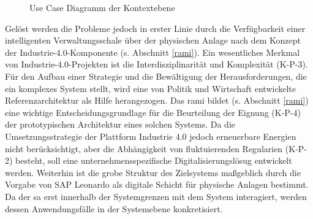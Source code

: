 \begin{figure}[ht!]
  \centering
  \noindent{}
  \caption[Use Case Diagramm der Kontextebene]{Use Case Diagramm der Kontextebene}
  \label{usecase_basic}
\end{figure}
\noindent Gelöst werden die Probleme jedoch in erster Linie durch die Verfügbarkeit einer intelligenten Verwaltungsschale über der physischen Anlage nach dem Konzept der Industrie-4.0-Komponente (s. Abschnitt \ref{rami}).
Ein wesentliches Merkmal von Industrie-4.0-Projekten ist die Interdisziplinarität und Komplexität (K-P-3). Für den Aufbau einer Strategie und die Bewältigung der Herausforderungen, die ein komplexes System stellt, wird eine von Politik und Wirtschaft entwickelte Referenzarchitektur als Hilfe herangezogen. Das \ac{rami} bildet (s. Abschnitt \ref{rami}) eine wichtige Entscheidungsgrundlage für die Beurteilung der Eignung (K-P-4) der prototypischen Architektur eines solchen Systems. Da die Umsetzungsstrategie der Plattform Industrie 4.0 \citep{BITKOM2015} jedoch erneuerbare Energien nicht berücksichtigt, aber die Abhängigkeit von fluktuierenden Regularien (K-P-2) besteht, soll eine unternehmensspezifische Digitalisierungslösug entwickelt werden. Weiterhin ist die grobe Struktur des Zielsystems maßgeblich durch die Vorgabe von SAP Leonardo als digitale Schicht für physische Anlagen bestimmt. Da der \ac{sa} erst innerhalb der Systemgrenzen mit dem System interagiert, werden dessen Anwendungsfälle in der Systemebene konkretisiert.

